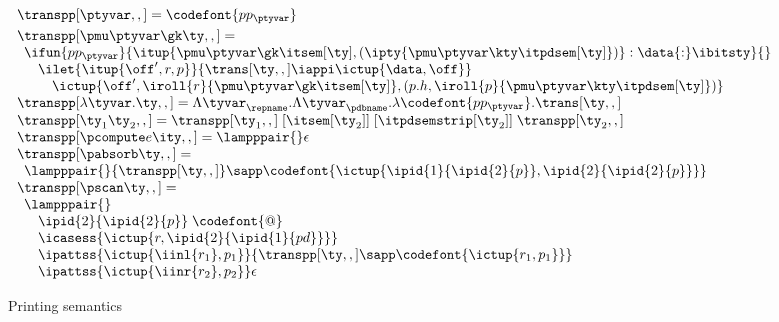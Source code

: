 \begin{figure*}
\[\begin{array}{l}
\begin{array}{l}
  \end{array}  
\\
\transpp[\ptyvar,,] = \codefont{pp_\ptyvar}
\\[3pt]
\transpp[\pmu \ptyvar \gk \ty,,] = \\
  \begin{array}{l}
  \ifun {pp_\ptyvar} {\itup{\pmu \ptyvar \gk \itsem[\ty], (\ipty{\pmu \ptyvar \kty \itpdsem[\ty]})}
                     : \data{:}\ibitsty} {}\\
  \quad \ilet {\itup{\off',r,p}} 
   {\trans[\ty,,] \iappi \ictup{\data,\off}} \\ 
  \qquad \ictup{\off',\iroll{r}{\pmu \ptyvar \gk \itsem[\ty]},
     (p.h,\iroll{p}{\pmu \ptyvar \kty \itpdsem[\ty]})}
  \end{array}  
\\[3pt]
\transpp[\lambda\tyvar . \ty,,] = %
    \Lambda \tyvar_\repname. 
    \Lambda \tyvar_\pdbname. \lambda \codefont{pp_\ptyvar}. \trans[\ty,,]
\\
\transpp[\ty_1 \ty_2,,] = 
    \transpp[\ty_1,,]\; [\itsem[\ty_2]]\; [\itpdsemstrip[\ty_2]]\; \transpp[\ty_2,,]
\\
\transpp[\pcompute e \ity,,] = \lampppair{} \epsilon \\
\transpp[\pabsorb \ty,,] = \\
  \begin{array}{l}  
    \lampppair{}
    {\transpp[\ty,,]} \sapp \codefont{\ictup{\ipid{1}{\ipid{2}{p}},
		                                   \ipid{2}{\ipid{2}{p}}}} \\
  \end{array}  
\\
\transpp[\pscan \ty,,] = \\
  \begin{array}{l}  
    \lampppair{}\\
    \quad \ipid{2}{\ipid{2}{p}} \; \codefont{@} \\
    \quad \icasess {\ictup{r,\ipid{2}{\ipid{1}{pd}}}} \\
    \quad \ipattss{\ictup{\iinl{r_1}, p_1}} 
	{ {\transpp[\ty,,]} \sapp \codefont{\ictup{r_1,p_1}}}\\
    \quad \ipattss{\ictup{\iinr{r_2}, p_2}} \epsilon\\
  \end{array}  
\\
\end{array}
\]
\caption{\ddc{} Printing semantics}
\label{fig:ddc-print-sem}
\end{figure*}


